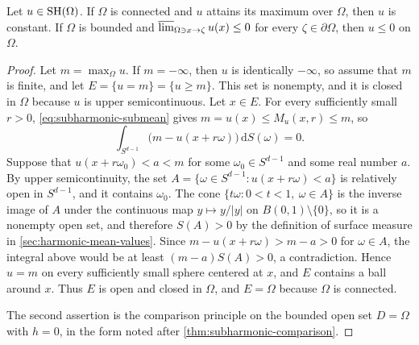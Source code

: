 \begin{proposition}\label{prop:subharmonic-maximum}
Let $u\in\mathrm{SH}(\Omega)$. If $\Omega$ is connected and $u$ attains its maximum over $\Omega$, then $u$ is constant. If $\Omega$ is bounded and $\varlimsup_{\Omega\ni x\to\zeta}u(x)\leq0$ for every $\zeta\in\partial\Omega$, then $u\leq0$ on $\Omega$.
\end{proposition}
\begin{proof}
Let $m=\max_\Omega u$. If $m=-\infty$, then $u$ is identically $-\infty$, so assume that $m$ is finite, and let $E=\{u=m\}=\{u\geq m\}$. This set is nonempty, and it is closed in $\Omega$ because $u$ is upper semicontinuous. Let $x\in E$. For every sufficiently small $r>0$, \eqref{eq:subharmonic-submean} gives $m=u(x)\leq M_u(x,r)\leq m$, so
\[
 \int_{S^{d-1}}\bigl(m-u(x+r\omega)\bigr)\,\mathrm dS(\omega)=0.
\]
Suppose that $u(x+r\omega_0)<a<m$ for some $\omega_0\in S^{d-1}$ and some real number $a$. By upper semicontinuity, the set $A=\{\omega\in S^{d-1}:u(x+r\omega)<a\}$ is relatively open in $S^{d-1}$, and it contains $\omega_0$. The cone $\{t\omega:0<t<1,\ \omega\in A\}$ is the inverse image of $A$ under the continuous map $y\mapsto y/|y|$ on $B(0,1)\setminus\{0\}$, so it is a nonempty open set, and therefore $S(A)>0$ by the definition of surface measure in \cref{sec:harmonic-mean-values}. Since $m-u(x+r\omega)>m-a>0$ for $\omega\in A$, the integral above would be at least $(m-a)S(A)>0$, a contradiction. Hence $u=m$ on every sufficiently small sphere centered at $x$, and $E$ contains a ball around $x$. Thus $E$ is open and closed in $\Omega$, and $E=\Omega$ because $\Omega$ is connected.

The second assertion is the comparison principle on the bounded open set $D=\Omega$ with $h=0$, in the form noted after \cref{thm:subharmonic-comparison}.
\end{proof}


